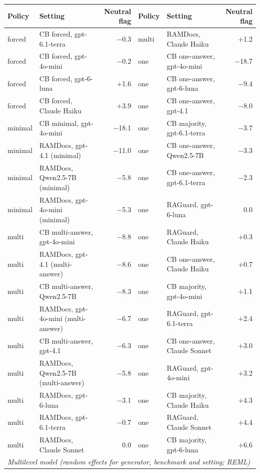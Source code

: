 \begin{table}[t]
\centering\footnotesize
\setlength{\tabcolsep}{4pt}
\begin{tabular}{llrllr}
\toprule
Policy & Setting & Neutral flag & Policy & Setting & Neutral flag \\
\midrule
forced & CB forced, gpt-6.1-terra & $-$0.3 & multi & RAMDocs, Claude Haiku & $+$1.2 \\
forced & CB forced, gpt-4o-mini & $-$0.2 & one & CB one-answer, gpt-4o-mini & $-$18.7 \\
forced & CB forced, gpt-6-luna & $+$1.6 & one & CB one-answer, gpt-6-luna & $-$9.4 \\
forced & CB forced, Claude Haiku & $+$3.9 & one & CB one-answer, gpt-4.1 & $-$8.0 \\
minimal & CB minimal, gpt-4o-mini & $-$18.1 & one & CB majority, gpt-6.1-terra & $-$3.7 \\
minimal & RAMDocs, gpt-4.1 (minimal) & $-$11.0 & one & CB one-answer, Qwen2.5-7B & $-$3.3 \\
minimal & RAMDocs, Qwen2.5-7B (minimal) & $-$5.8 & one & CB one-answer, gpt-6.1-terra & $-$2.3 \\
minimal & RAMDocs, gpt-4o-mini (minimal) & $-$5.3 & one & RAGuard, gpt-6-luna & 0.0 \\
multi & CB multi-answer, gpt-4o-mini & $-$8.8 & one & RAGuard, Claude Haiku & $+$0.3 \\
multi & RAMDocs, gpt-4.1 (multi-answer) & $-$8.6 & one & CB one-answer, Claude Haiku & $+$0.7 \\
multi & CB multi-answer, Qwen2.5-7B & $-$8.3 & one & CB majority, gpt-4o-mini & $+$1.1 \\
multi & RAMDocs, gpt-4o-mini (multi-answer) & $-$6.7 & one & RAGuard, gpt-6.1-terra & $+$2.4 \\
multi & CB multi-answer, gpt-4.1 & $-$6.3 & one & CB one-answer, Claude Sonnet & $+$3.0 \\
multi & RAMDocs, Qwen2.5-7B (multi-answer) & $-$5.8 & one & RAGuard, gpt-4o-mini & $+$3.2 \\
multi & RAMDocs, gpt-6-luna & $-$3.1 & one & CB majority, Claude Haiku & $+$4.3 \\
multi & RAMDocs, gpt-6.1-terra & $-$0.7 & one & RAGuard, Claude Sonnet & $+$4.4 \\
multi & RAMDocs, Claude Sonnet & 0.0 & one & CB majority, gpt-6-luna & $+$6.6 \\
\midrule
\multicolumn{6}{l}{\emph{Multilevel model (random effects for generator, benchmark and setting; REML)}} \\

\end{tabular}
\end{table}
